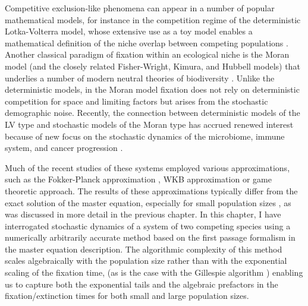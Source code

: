 Competitive exclusion-like phenomena can appear in a number of popular mathematical models, for instance in the competition regime of the deterministic Lotka-Volterra model, whose extensive use as a toy model enables a mathematical definition of the niche overlap between competing populations \cite{MacArthur1967,Abrams1980,Schoener1985,Chesson2008}. 
Another classical paradigm of fixation within an ecological niche is the Moran model (and the closely related Fisher-Wright, Kimura, and Hubbell models) that underlies a number of modern neutral theories of biodiversity \cite{Moran1962,Lin2012,Kimura1968,Kingman1982,Hubbell2001,Abrams1983,Mayfield2010}. 
Unlike the deterministic models, in the Moran model fixation does not rely on deterministic competition for space and limiting factors but arises from the stochastic demographic noise. 
Recently, the connection between deterministic models of the LV type and stochastic models of the Moran type has accrued renewed interest because of new focus on the stochastic dynamics of the microbiome, immune system, and cancer progression \cite{Antal2006,Lin2012,Constable2015,Chotibut2015,Ashcroft2015,Assaf2016,Vega2017,Posfai2017}. %

Much of the recent studies of these systems employed various approximations, such as the Fokker-Planck approximation \cite{Chotibut2015,Dobrinevski2012,Fisher2014,Constable2015,Lin2012}, WKB approximation \cite{Kessler2007,Gabel2013} or game theoretic \cite{Antal2006} approach. 
The results of these approximations typically differ from the exact solution of the master equation, especially for small population sizes \cite{Doering2005,Kessler2007,Ovaskainen2010,Assaf2016,Badali2018}, as was discussed in more detail in the previous chapter. 
In this chapter, I have interrogated stochastic dynamics of a system of two competing species using a numerically arbitrarily accurate method based on the first passage formalism in the master equation description. 
The algorithmic complexity of this method scales algebraically with the population size rather than with the exponential scaling of the fixation time, (as is the case with the Gillespie algorithm \cite{Gillespie1977}) enabling us to capture both the exponential tails and the algebraic prefactors in the fixation/extinction times for both small and large population sizes. %

